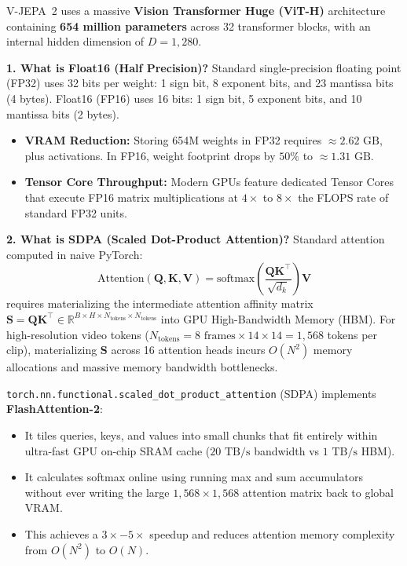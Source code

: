 \documentclass[11pt, a4paper]{article}
\begin{document}
\begin{explainbox}
V-JEPA~2 uses a massive \textbf{Vision Transformer Huge (ViT-H)} architecture containing \textbf{654 million parameters} across 32 transformer blocks, with an internal hidden dimension of $D=1{,}280$.

\textbf{1. What is Float16 (Half Precision)?}
Standard single-precision floating point (FP32) uses 32 bits per weight: 1 sign bit, 8 exponent bits, and 23 mantissa bits (4 bytes). Float16 (FP16) uses 16 bits: 1 sign bit, 5 exponent bits, and 10 mantissa bits (2 bytes).
\begin{itemize}[leftmargin=1.2em]
    \item \textbf{VRAM Reduction:} Storing 654M weights in FP32 requires $\approx 2.62\text{ GB}$, plus activations. In FP16, weight footprint drops by $50\%$ to $\approx 1.31\text{ GB}$.
    \item \textbf{Tensor Core Throughput:} Modern GPUs feature dedicated Tensor Cores that execute FP16 matrix multiplications at $4\times$ to $8\times$ the FLOPS rate of standard FP32 units.
\end{itemize}

\textbf{2. What is SDPA (Scaled Dot-Product Attention)?}
Standard attention computed in naive PyTorch:
$$\text{Attention}(\mathbf{Q}, \mathbf{K}, \mathbf{V}) = \text{softmax}\left(\frac{\mathbf{Q}\mathbf{K}^\top}{\sqrt{d_k}}\right)\mathbf{V}$$
requires materializing the intermediate attention affinity matrix $\mathbf{S} = \mathbf{Q}\mathbf{K}^\top \in \mathbb{R}^{B \times H \times N_{\text{tokens}} \times N_{\text{tokens}}}$ into GPU High-Bandwidth Memory (HBM). For high-resolution video tokens ($N_{\text{tokens}} = 8 \text{ frames} \times 14 \times 14 = 1{,}568$ tokens per clip), materializing $\mathbf{S}$ across 16 attention heads incurs $O(N^2)$ memory allocations and massive memory bandwidth bottlenecks.

\texttt{torch.nn.functional.scaled\_dot\_product\_attention} (SDPA) implements \textbf{FlashAttention-2}:
\begin{itemize}[leftmargin=1.2em]
    \item It tiles queries, keys, and values into small chunks that fit entirely within ultra-fast GPU on-chip SRAM cache ($20\text{ TB/s}$ bandwidth vs $1\text{ TB/s}$ HBM).
    \item It calculates softmax online using running max and sum accumulators without ever writing the large $1{,}568 \times 1{,}568$ attention matrix back to global VRAM.
    \item This achieves a $3\times-5\times$ speedup and reduces attention memory complexity from $O(N^2)$ to $O(N)$.
\end{itemize}
\end{explainbox}
\end{document}
